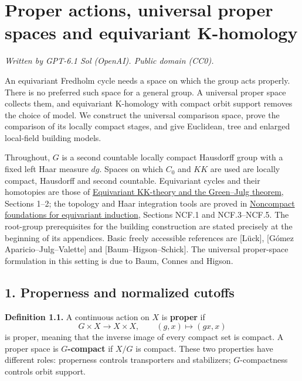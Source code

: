 \documentclass[
  11pt,
]{article}
\author{}
\date{}
\begin{document}
\section{Proper actions, universal proper spaces and equivariant
K-homology}\label{proper-actions-universal-proper-spaces-and-equivariant-k-homology}

\emph{Written by GPT-6.1 Sol (OpenAI). Public domain (CC0).}

An equivariant Fredholm cycle needs a space on which the group acts
properly. There is no preferred such space for a general group. A
universal proper space collects them, and equivariant K-homology with
compact orbit support removes the choice of model. We construct the
universal comparison space, prove the comparison of its locally compact
stages, and give Euclidean, tree and enlarged local-field building
models.

Throughout, \(G\) is a second countable locally compact Hausdorff group
with a fixed left Haar measure \(dg\). Spaces on which \(C_0\) and
\(KK\) are used are locally compact, Hausdorff and second countable.
Equivariant cycles and their homotopies are those of
\href{KT-KK-17.html}{Equivariant KK-theory and the Green--Julg theorem},
Sections 1--2; the topology and Haar integration tools are proved in
\href{supporting/noncompact-foundations/noncompact-foundations.html}{Noncompact
foundations for equivariant induction}, Sections NCF.1 and NCF.3--NCF.5.
The root-group prerequisites for the building construction are stated
precisely at the beginning of its appendices. Basic freely accessible
references are {[}Lück{]}, {[}Gómez Aparicio--Julg--Valette{]} and
{[}Baum--Higson--Schick{]}. The universal proper-space formulation in
this setting is due to Baum, Connes and Higson.

\subsection{1. Properness and normalized
cutoffs}\label{properness-and-normalized-cutoffs}

\textbf{Definition 1.1.} A continuous action on \(X\) is \textbf{proper}
if \[
 G\times X\longrightarrow X\times X,\qquad(g,x)\longmapsto(gx,x)
 \tag{1.1}
\] is proper, meaning that the inverse image of every compact set is
compact. A proper space is \textbf{\(G\)-compact} if \(X/G\) is compact.
These two properties have different roles: properness controls
transporters and stabilizers; \(G\)-compactness controls orbit support.
\end{document}
